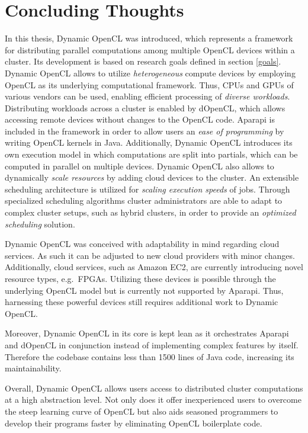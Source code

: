 \section{Concluding Thoughts}
\label{concluding_thoughts}
In this thesis, Dynamic OpenCL was introduced, which represents a framework for distributing parallel computations among multiple OpenCL devices within a cluster. Its development is based on research goals defined in section \ref{goals}. Dynamic OpenCL allows to utilize \textit{heterogeneous} compute devices by employing OpenCL as its underlying computational framework. Thus, CPUs and GPUs of various vendors can be used, enabling efficient processing of \textit{diverse workloads}. Distributing workloads across a cluster is enabled by dOpenCL, which allows accessing remote devices without changes to the OpenCL code. Aparapi is included in the framework in order to allow users an \textit{ease of programming} by writing OpenCL kernels in Java. Additionally, Dynamic OpenCL introduces its own execution model in which computations are split into partials, which can be computed in parallel on multiple devices. Dynamic OpenCL also allows to dynamically \textit{scale resources} by adding cloud devices to the cluster. An extensible scheduling architecture is utilized for \textit{scaling execution speeds} of jobs. Through specialized scheduling algorithms cluster administrators are able to adapt to complex cluster setups, such as hybrid clusters, in order to provide an \textit{optimized scheduling} solution.

Dynamic OpenCL was conceived with adaptability in mind regarding cloud services. As such it can be adjusted to new cloud providers with minor changes. Additionally, cloud services, such as Amazon EC2, are currently introducing novel resource types, e.g.~FPGAs\cite{amazon_fpga}. Utilizing these devices is possible through the underlying OpenCL model but is currently not supported by Aparapi. Thus, harnessing these powerful devices still requires additional work to Dynamic OpenCL.

Moreover, Dynamic OpenCL in its core is kept lean as it orchestrates Aparapi and dOpenCL in conjunction instead of implementing complex features by itself. Therefore the codebase contains less than 1500 lines of Java code, increasing its maintainability.

Overall, Dynamic OpenCL allows users access to distributed cluster computations at a high abstraction level. Not only does it offer inexperienced users to overcome the steep learning curve of OpenCL but also aids seasoned programmers to develop their programs faster by eliminating OpenCL boilerplate code.

